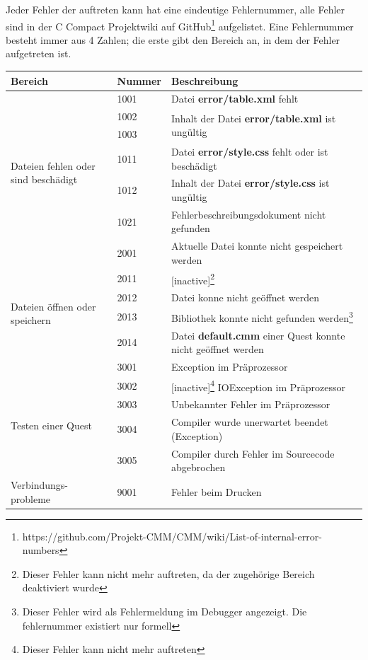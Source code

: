 Jeder Fehler der auftreten kann hat eine eindeutige Fehlernummer, alle Fehler sind in der C Compact Projektwiki auf GitHub\footnote{https://github.com/Projekt-CMM/CMM/wiki/List-of-internal-error-numbers} aufgelistet. Eine Fehlernummer besteht immer aus 4 Zahlen; die erste gibt den Bereich an, in dem der Fehler aufgetreten ist.
\def\arraystretch{1.6}
\begin{minipage}{14cm}
\begin{tabular}{l|l|l}
	Bereich&Nummer&Beschreibung\\
	\hline
	&1001&Datei \textbf{error/table.xml} fehlt\\
	\multirow{5}{15mm}{\begin{sideways}\parbox{35mm}{Dateien fehlen oder sind beschädigt}\end{sideways}}&1002&\multirow{2}{*}{Inhalt der Datei \textbf{error/table.xml} ist ungültig}\\
	&1003&\\
	&1011&Datei \textbf{error/style.css} fehlt oder ist beschädigt\\
	&1012&Inhalt der Datei \textbf{error/style.css} ist ungültig\\
	&1021&Fehlerbeschreibungsdokument nicht gefunden\\
	\hline
	&2001&Aktuelle Datei konnte nicht gespeichert werden\\
	\multirow{4}{15mm}{\begin{sideways}\parbox{25mm}{Dateien öffnen oder speichern}\end{sideways}}&2011&[inactive]\footnote{Dieser Fehler kann nicht mehr auftreten, da der zugehörige Bereich deaktiviert wurde}\\
	&2012&Datei konne nicht geöffnet werden\\
	&2013&Bibliothek konnte nicht gefunden werden\footnote{Dieser Fehler wird als Fehlermeldung im Debugger angezeigt. Die fehlernummer existiert nur formell}\\%
	&2014&Datei \textbf{default.cmm} einer Quest konnte nicht geöffnet werden\\%
	\hline
	&3001&Exception im Präprozessor\\
	\multirow{4}{15mm}{\begin{sideways}\parbox{25mm}{Testen einer Quest}\end{sideways}}&3002&[inactive]\footnote{Dieser Fehler kann nicht mehr auftreten} IOException im Präprozessor\\
	&3003&Unbekannter Fehler im Präprozessor\\
	&3004&Compiler wurde unerwartet beendet (Exception)\\
	&3005&Compiler durch Fehler im Sourcecode abgebrochen\\
	\hline
	\parbox{23mm}{Verbindungs- probleme}&9001&Fehler beim Drucken
\end{tabular}
\end{minipage}




